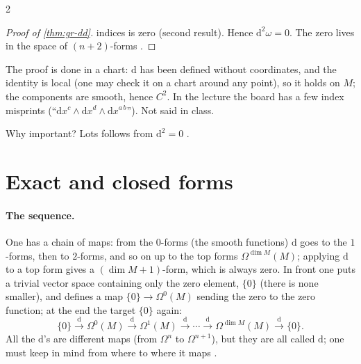 \begin{paracol}{2}
\begin{proof}[Proof of \cref{thm:gr-dd}]
indices is zero (second result). Hence $\mathrm d^2\omega=0$. The zero lives in the space of $(n+2)$-forms           .
\end{proof}
\begin{coursenote}
The proof is done in a chart: $\mathrm d$ has been defined without coordinates, and the identity is local (one may check it on a chart around any point), so it holds on $M$; the components are smooth, hence $C^2$. In the lecture the board has a few index misprints (``$\mathrm dx^c\wedge\mathrm dx^d\wedge\mathrm dx^{a\,b}$''). Not said in class.
\end{coursenote}
Why important? Lots follows from $\mathrm d^2=0$  .

\section{Exact and closed forms}\label{sec:gr-exact}

\paragraph{The sequence.} One has a chain of maps: from the $0$-forms (the smooth functions) $\mathrm d$ goes to the $1$-forms, then to $2$-forms, and so on up to the top forms $\Omega^{\dim M}(M)$; applying $\mathrm d$ to a top form gives a $(\dim M+1)$-form, which is always zero. In front one puts a trivial vector space containing only the zero element, $\{0\}$ (there is none smaller), and defines a map $\{0\}\to\Omega^0(M)$ sending
the zero to the zero function; at the end the target $\{0\}$ again:
\[
  \{0\}\xrightarrow{\ \mathrm d\ }\Omega^0(M)\xrightarrow{\ \mathrm d\ }\Omega^1(M)\xrightarrow{\ \mathrm d\ }\cdots\xrightarrow{\ \mathrm d\ }\Omega^{\dim M}(M)\xrightarrow{\ \mathrm d\ }\{0\}.
\]
All the $\mathrm d$'s are different maps (from $\Omega^n$ to $\Omega^{n+1}$), but they are all called $\mathrm d$; one must keep in mind from where to where it maps         .


\end{paracol}
